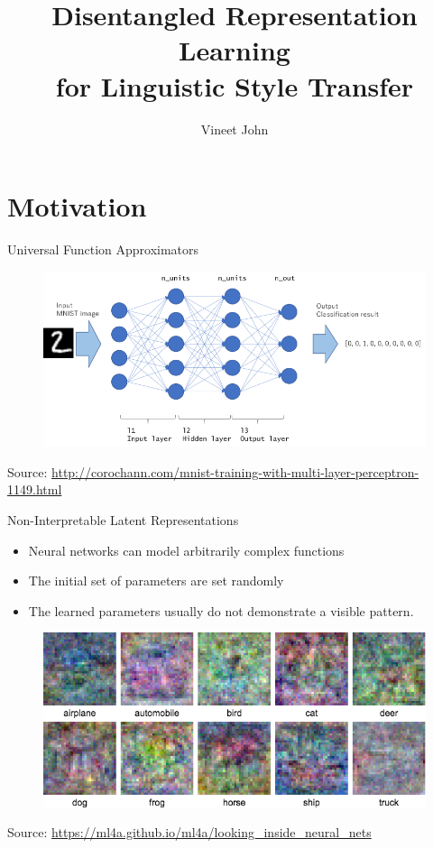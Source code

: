 \documentclass[aspectratio=169]{beamer}
\title{
	Disentangled Representation Learning\\
	for Linguistic Style Transfer}
\date{}
\author{Vineet John}
\institute{University of Waterloo}
\newcommand{\imgsrc}[1]{\tiny{Source: #1}}
\begin{document}
\maketitle
\graphicspath{{images/}}

\section{Motivation}

\begin{frame}{Universal Function Approximators}
	\centering
	\begin{figure}[ht]
		\includegraphics[width=\linewidth]{mlp-network}
	\end{figure}
	\imgsrc{\url{http://corochann.com/mnist-training-with-multi-layer-perceptron-1149.html}}
\end{frame}

\begin{frame}{Non-Interpretable Latent Representations}
	\begin{itemize}
		\item Neural networks can model arbitrarily complex functions
		\item The initial set of parameters are set randomly
		\item The learned parameters usually do not demonstrate a visible pattern.
	\end{itemize}

	\centering
	\begin{figure}[ht]
		\includegraphics[width=0.6\linewidth]{uninterpretable-weights}
	\end{figure}
	\imgsrc{\url{https://ml4a.github.io/ml4a/looking_inside_neural_nets}}
\end{frame}
\end{document}
